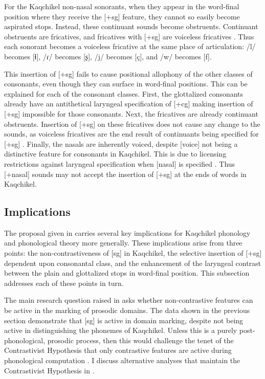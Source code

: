 \documentclass[output=paper,colorlinks,citecolor=brown]{langscibook}
\begin{document}
For the Kaqchikel non-nasal sonorants, when they appear in the word-final position where they receive the [+sg] feature, they cannot so easily become aspirated stops. Instead, these continuant sounds become obstruents. Continuant obstruents are fricatives, and fricatives with [+sg] are voiceless fricatives \citep{vaux_1998}. Thus each sonorant becomes a voiceless fricative at the same place of articulation: /l/ becomes [ɬ], /ɾ/ becomes [ʂ], /j/ becomes [ç], and /w/ becomes [f].

This insertion of [+sg] fails to cause positional allophony of the other classes of consonants, even though they can surface in word-final positions. This can be explained for each of the consonant classes. First, the glottalized consonants already have an antithetical laryngeal specification of [+cg] making insertion of [+sg] impossible for those consonants. Next, the fricatives are already continuant obstruents. Insertion of [+sg] on these fricatives does not cause any change to the sounds, as voiceless fricatives are the end result of continuants being specified for [+sg] \citep{vaux_1998}. Finally, the nasals are inherently voiced, despite [voice] not being a distinctive feature for consonants in Kaqchikel. This is due to licensing restrictions against laryngeal specification when [nasal] is specified \citep{ito_mester_padgett_1995}. Thus [+nasal] sounds may not accept the insertion of [+sg] at the ends of words in Kaqchikel.

\subsection{Implications}\label{Implications}
The proposal given in  carries several key implications for Kaqchikel phonology and phonological theory more generally. These implications arise from three points: the non-contrastiveness of [sg] in Kaqchikel, the selective insertion of [+sg] dependent upon consonantal class, and the enhancement of the laryngeal contrast between the plain and glottalized stops in word-final position. This subsection addresses each of these points in turn.

The main research question raised in  asks whether non-contrastive features can be active in the marking of prosodic domains. The data shown in the previous section demonstrate that [sg] is active in domain marking, despite not being active in distinguishing the phonemes of Kaqchikel. Unless this is a purely post-phonological, prosodic process, then this would challenge the tenet of the Contrastivist Hypothesis that only contrastive features are active during phonological computation \citep{hall_2007, Dresher:2009}. I discuss alternative analyses that maintain the Contrastivist Hypothesis in .
\end{document}
